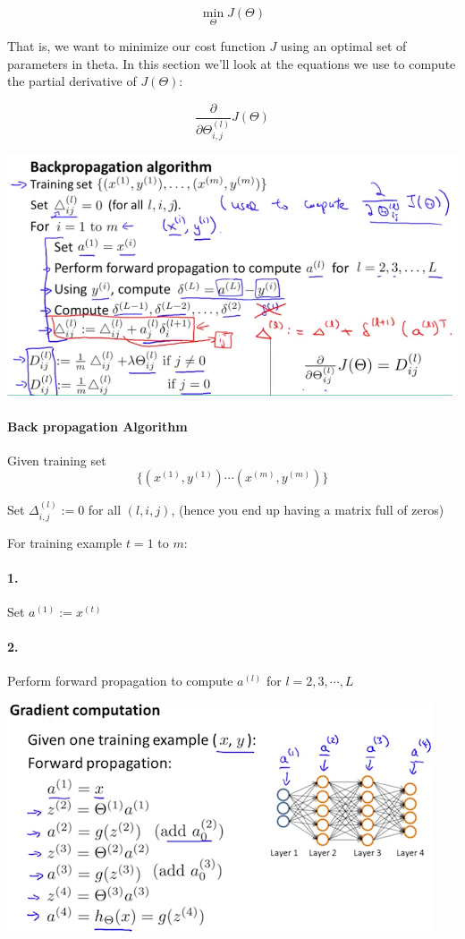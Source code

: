 \documentclass[UTF8]{article}
\begin{document}
\[\min_\Theta J(\Theta)\]

That is, we want to minimize our cost function $J$ using an optimal set of parameters in theta. In this section we'll look at the equations we use to compute the partial derivative of $J(\Theta)$:

\[\dfrac{\partial}{\partial \Theta_{i,j}^{(l)}}J(\Theta)\]

\includegraphics[width = .8\textwidth]{NotePics/9_2_1.png}

\paragraph{Back propagation Algorithm}

Given training set $$\lbrace (x^{(1)}, y^{(1)}) \cdots (x^{(m)}, y^{(m)})\rbrace$$

Set $\Delta^{(l)}_{i,j} := 0$ for all $(l,i,j)$, (hence you end up having a matrix full of zeros)

For training example $t =1$ to $m$:

\paragraph{1.} Set $a^{(1)}:=x^{(t)}$
\paragraph{2.} Perform forward propagation to compute $a^{(l)}$ for $l = 2,3,\cdots,L$

\includegraphics[width = .8\textwidth]{NotePics/9_2_2.png}
\end{document}
